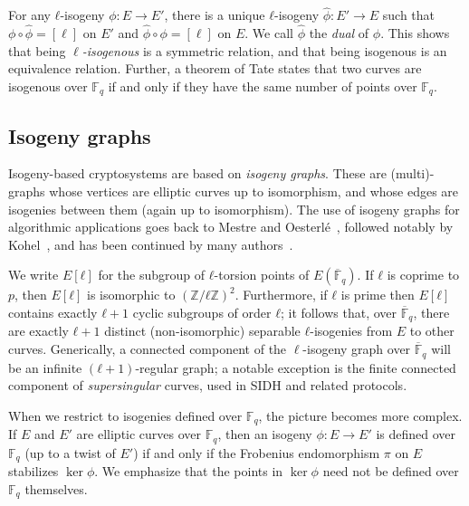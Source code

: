 \documentclass{llncs}
\newcommand{\F}{\mathbb{F}}
\newcommand{\Fbar}{\overline{\mathbb{F}}}
\begin{document}
For any $ℓ$-isogeny $ϕ:E→E'$, there is a unique $ℓ$-isogeny
$\hat{ϕ}:E'→E$ such that $ϕ∘\hat{ϕ} = [\ell]$ on $E'$
and $\hat{ϕ}∘ϕ = [\ell]$ on $E$.
We call $\hat{ϕ}$ the \emph{dual} of $ϕ$. This
shows that being \emph{$\ell$-isogenous} is a symmetric
relation, and that being isogenous is an equivalence relation.
 Further, a theorem of Tate states that two curves are
isogenous over $\F_q$ if and only if they have the same number of
points over $\F_q$.


\subsection{Isogeny graphs}
\label{sec:isogeny-graphs}

Isogeny-based cryptosystems are based on \emph{isogeny graphs}.
These are
(multi)-graphs whose vertices are
elliptic curves up to isomorphism, and whose edges are isogenies
between them (again up to isomorphism).
The use of isogeny graphs for algorithmic applications 
goes back to Mestre and Oesterlé~\cite{Mestre},
followed notably by Kohel~\cite{kohel},
and has been continued by many
authors~\cite{Gal,fouquet+morain02,GHS,MiretMSTV06,jao+miller+venkatesan09}.

We write $E[ℓ]$ for the subgroup of $ℓ$-torsion points of
$E(\Fbar_q)$.  If $ℓ$ is coprime to $p$, then $E[ℓ]$ is isomorphic to
$(ℤ/ℓℤ)^2$.  Furthermore, if $ℓ$ is prime then $E[ℓ]$ contains exactly
$ℓ+1$ cyclic subgroups of order $ℓ$; it follows that, over $\Fbar_q$,
there are exactly $ℓ+1$ distinct (non-isomorphic) separable $ℓ$-isogenies 
from $E$ to other curves.
Generically, a connected component of the $\ell$-isogeny graph 
over $\Fbar_q$ will be an infinite $(ℓ+1)$-regular
graph; a notable exception is the finite connected component of
\emph{supersingular} curves, used in SIDH and related protocols.

When we restrict to isogenies defined over $\F_q$, 
the picture becomes more complex.  
If $E$ and $E'$ are elliptic curves over $\F_q$,
then an isogeny $ϕ:E→E'$ is defined over $\F_q$
(up to a twist of $E'$)
if and only if the Frobenius endomorphism $\pi$ on $E$ stabilizes $\ker ϕ$.
We emphasize that the points in $\ker\phi$ need not
be defined over $\F_q$ themselves.
\end{document}
